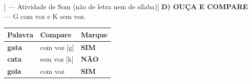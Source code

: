 \begin{exercicio}[Som /g/ [[g]] --- Atividade de Som (não de letra nem de sílaba)]
\textbf{D) OUÇA E COMPARE} --- G com voz e K sem voz.

\begin{center}
\begin{tabular}{@{}p{4.2cm}p{6.2cm}p{1.6cm}@{}}
\hline
\textbf{Palavra} & \textbf{Compare} & \textbf{Marque} \\
\hline
\textbf{gata} & com voz [g] & \textbf{SIM} \\
\textbf{cata} & sem voz [k] & \textbf{NÃO} \\
\textbf{gola} & com voz & \textbf{SIM} \\
\hline
\end{tabular}
\end{center}

\end{exercicio}

